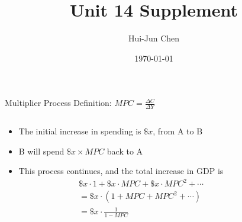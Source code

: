 \documentclass{beamer}
\title{Unit 14 Supplement}
\author{Hui-Jun Chen}
\institute{The Ohio State University}
\date{\today}
\begin{document}
\maketitle



\begin{frame}{Multiplier Process}
\label{slide:Multiplier_Process}
    Definition: $ MPC = \frac{\Delta C}{\Delta Y} $

    \begin{columns}
        \begin{column}{0.6\textwidth}
        \begin{itemize}
            \item The initial increase in spending is $ \$x $, from A to B
            \item B will spend $ \$x \times MPC $ back to A
            \item This process continues, and the total increase in GDP is
                    \begin{equation*}
                        \begin{split}
                                & \$x \cdot 1 + \$x \cdot MPC + \$x \cdot MPC^{2} + \cdots
                            \\
                                & = \$x \cdot ( 1 + MPC + MPC^{2} + \cdots )
                            \\
                                & = \$x \cdot \frac{1}{1 - MPC}
                            \\
                        \end{split}
                    \end{equation*}
        \end{itemize}
        \end{column}
        \begin{column}{0.5\textwidth}
\end{column}
\end{columns}
\end{frame}
\end{document}
